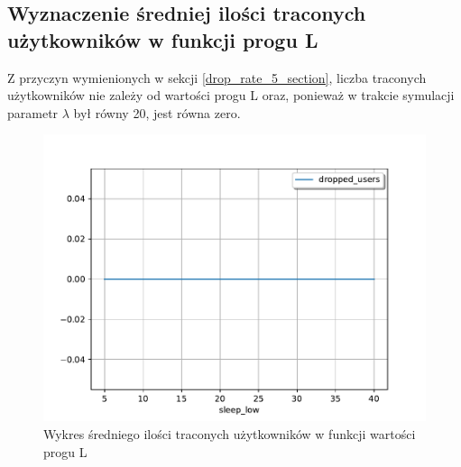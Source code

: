 \subsection{Wyznaczenie średniej ilości traconych użytkowników w funkcji progu L} \label{drop_l_plot}
Z przyczyn wymienionych w sekcji \ref{drop_rate_5_section}, liczba traconych użytkowników nie zależy od wartości progu L oraz, ponieważ w trakcie symulacji parametr $\lambda$ był równy 20, jest równa zero.

\begin{figure}[h]
\center
\includegraphics[scale=0.65]{img/dropped_users_lambda_20.pdf} 
\caption{Wykres średniego ilości traconych użytkowników w funkcji wartości progu L}
\label{drop_over_time_sleep}
\end{figure}
